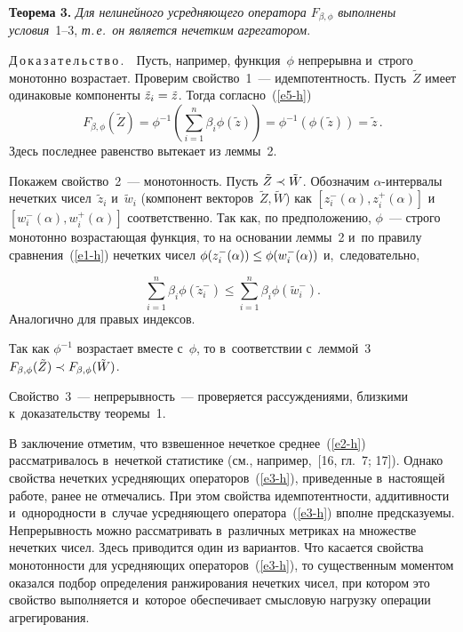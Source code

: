 \begin{multicols}{2}
\noindent
\textbf{Теорема 3.} \textit{Для нелинейного усредняющего оператора 
$F_{\beta,\phi}$ выполнены условия}~1--3, \textit{т.\,е.\ он является  нечетким 
агрегатором}.

\smallskip

\noindent
Д\,о\,к\,а\,з\,а\,т\,е\,л\,ь\,с\,т\,в\,о\,.\ \  Пусть, например, функция~$\phi$ непрерывна и~строго 
монотонно возрастает.  Проверим свойство~1~--- идемпотентность. Пусть~$\tilde{Z}$ 
имеет одинаковые компоненты $\tilde{z}_i \hm= \tilde{z}$. Тогда согласно~(\ref{e5-h})
$$
F_{\beta,\phi}(\tilde{Z}) =  \phi^{-1}\left(\sum\limits_{i=1}^n\beta_i\phi\left(\tilde{z}\right)\right) =  \phi^{-1}\left(\phi(\tilde{z})\right) = 
\tilde{z}\,.
$$
Здесь последнее равенство вытекает из леммы~2.

Покажем свойство~2~--- монотонность. Пусть $\tilde{Z}\hm\prec\tilde{W}$. Обозначим 
$\alpha$-ин\-тер\-ва\-лы нечетких чисел~$\tilde{z}_i$ и~$\tilde{w}_i$ (компонент 
векторов~$\tilde{Z}, \tilde{W}$) как $[z^{-}_i(\alpha), z^{+}_i(\alpha)]$ 
и~$[w^{-}_i(\alpha), w^{+}_i(\alpha)]$ соответственно. Так как, по предположению, 
$\phi$~--- строго монотонно  возрастающая функция, то на основании леммы~2 и~по 
правилу сравнения~(\ref{e1-h}) нечетких чисел $\phi(z^{-}_i(\alpha))\hm\leq\phi(w^{-}_i(\alpha))$ 
и,~следовательно, 

\noindent
$$
\sum\limits_{i=1}^n\beta_i\phi\left(\tilde{z}_i^{-}\right)\leq\sum\limits_{i=1}^n\beta_i\phi\left(\tilde{w}_i^{-}\right).
$$ 
Аналогично для правых  индексов.

Так как $\phi^{-1}$ возрастает вместе с~$\phi$, то в~соответствии с~леммой~3 
$F_{\beta,\phi}(\tilde{Z})\hm\prec F_{\beta,\phi}(\tilde{W})$.

Свойство~3~--- непрерывность~--- проверяется рассуждениями, близкими к~доказательству теоремы~1.


\smallskip

В заключение отметим, что взвешенное нечеткое среднее~(\ref{e2-h}) рассматривалось 
в~нечеткой статистике (см., например,~[16, гл.~7; 17]). Однако свойства нечетких 
усредняющих операторов~(\ref{e3-h}), приведенные в~настоящей работе, ранее не отмечались.
%
При этом свойства идемпотентности, аддитивности  и~однородности в~случае 
усредняющего оператора~(\ref{e3-h}) вполне предсказуемы. Непрерывность можно 
рассматривать в~различных метриках на множестве нечетких чисел. Здесь приводится 
один из вариантов.  Что касается свойства монотонности для усредняющих 
операторов~(\ref{e3-h}), то существенным моментом оказался подбор определения 
ранжирования нечетких чисел, при котором это свойство выполняется и~которое 
обеспечивает смысловую нагрузку операции агрегирования.


\end{multicols}
